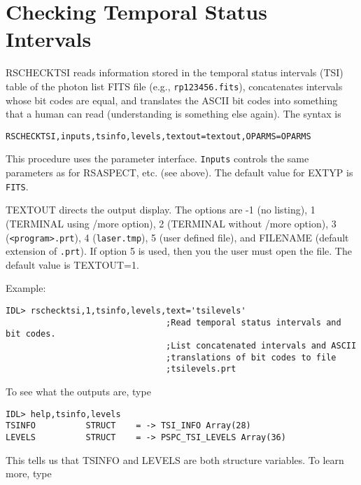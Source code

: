 \section{Checking Temporal Status Intervals}
 
RSCHECKTSI reads information stored in the temporal status intervals (TSI)
table of the photon list FITS file (e.g., {\tt rp123456.fits}), concatenates
intervals whose bit codes are equal, and translates the ASCII bit codes into
something that a human can read (understanding is something else again). The
syntax is

\medskip\noindent
\begin{verbatim}
RSCHECKTSI,inputs,tsinfo,levels,textout=textout,OPARMS=OPARMS
\end{verbatim}
This procedure uses the parameter interface. {\tt Inputs} controls the same
parameters as for RSASPECT, etc. (see above). The default value for EXTYP is
{\tt FITS}.
 
TEXTOUT directs the output display. The options are -1 (no listing), 1
(TERMINAL using /more option), 2 (TERMINAL without /more option), 3
({\tt <program>.prt}), 4 ({\tt laser.tmp}), 5 (user defined file), and FILENAME
(default extension of {\tt .prt}). If option 5 is used, then you the user must open
the file. The default value is TEXTOUT=1.
 
Example:

\medskip\noindent
\begin{verbatim}
IDL> rschecktsi,1,tsinfo,levels,text='tsilevels'
                                ;Read temporal status intervals and bit codes.
                                ;List concatenated intervals and ASCII
                                ;translations of bit codes to file
                                ;tsilevels.prt
\end{verbatim}
To see what the outputs are, type

\medskip\noindent
\begin{verbatim}
IDL> help,tsinfo,levels
TSINFO          STRUCT    = -> TSI_INFO Array(28)
LEVELS          STRUCT    = -> PSPC_TSI_LEVELS Array(36)
\end{verbatim}
This tells us that TSINFO and LEVELS are both structure variables. To learn
more, type

